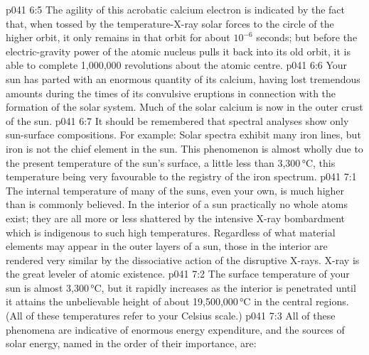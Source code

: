 \vs p041 6:5 The agility of this acrobatic calcium electron is indicated by the fact that, when tossed by the temperature\hyp{}X\hyp{}ray solar forces to the circle of the higher orbit, it only remains in that orbit for about $10^{-6}$ seconds; but before the electric\hyp{}gravity power of the atomic nucleus pulls it back into its old orbit, it is able to complete 1,000,000 revolutions about the atomic centre.
\vs p041 6:6 \pc Your sun has parted with an enormous quantity of its calcium, having lost tremendous amounts during the times of its convulsive eruptions in connection with the formation of the solar system. Much of the solar calcium is now in the outer crust of the sun.
\vs p041 6:7 \pc It should be remembered that spectral analyses show only sun\hyp{}surface compositions. For example: Solar spectra exhibit many iron lines, but iron is not the chief element in the sun. This phenomenon is almost wholly due to the present temperature of the sun’s surface, a little less than 3,300\,°C, this temperature being very favourable to the registry of the iron spectrum.
\vs p041 7:1 The internal temperature of many of the suns, even your own, is much higher than is commonly believed. In the interior of a sun practically no whole atoms exist; they are all more or less shattered by the intensive X\hyp{}ray bombardment which is indigenous to such high temperatures. Regardless of what material elements may appear in the outer layers of a sun, those in the interior are rendered very similar by the dissociative action of the disruptive X\hyp{}rays. X\hyp{}ray is the great leveler of atomic existence.
\vs p041 7:2 The surface temperature of your sun is almost 3,300\,°C, but it rapidly increases as the interior is penetrated until it attains the unbelievable height of about 19,500,000\,°C in the central regions. (All of these temperatures refer to your Celsius scale.)
\vs p041 7:3 \pc All of these phenomena are indicative of enormous energy expenditure, and the sources of solar energy, named in the order of their importance, are:
